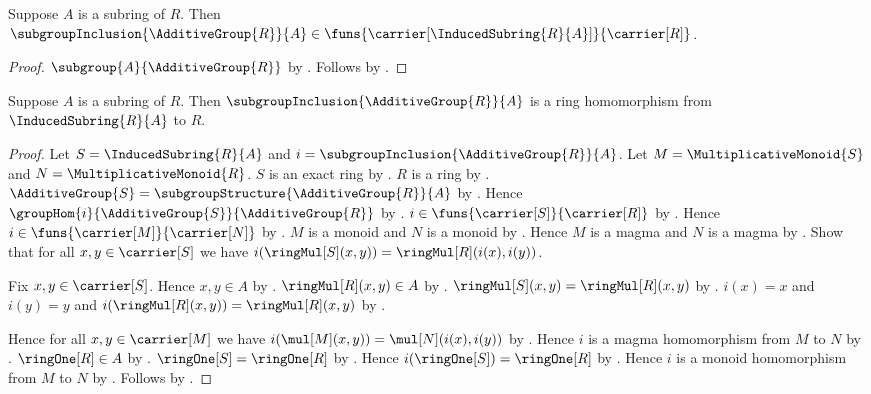 \begin{proposition}\label{induced_subring_inclusion_type}
    Suppose $A$ is a subring of $R$.
    Then $\subgroupInclusion{\AdditiveGroup{R}}{A}
        \in\funs{\carrier[\InducedSubring{R}{A}]}{\carrier[R]}$.
\end{proposition}
\begin{proof}
    $\subgroup{A}{\AdditiveGroup{R}}$ by
        .
    Follows by
        .
\end{proof}

\begin{theorem}\label{induced_subring_inclusion_hom}
    Suppose $A$ is a subring of $R$.
    Then $\subgroupInclusion{\AdditiveGroup{R}}{A}$ is a ring
        homomorphism from $\InducedSubring{R}{A}$ to $R$.
\end{theorem}
\begin{proof}
    Let $S=\InducedSubring{R}{A}$ and
        $i=\subgroupInclusion{\AdditiveGroup{R}}{A}$.
    Let $M=\MultiplicativeMonoid{S}$ and
        $N=\MultiplicativeMonoid{R}$.
    $S$ is an exact ring by .
    $R$ is a ring by .
    $\AdditiveGroup{S}=\subgroupStructure{\AdditiveGroup{R}}{A}$ by
        .
    Hence $\groupHom{i}{\AdditiveGroup{S}}{\AdditiveGroup{R}}$ by
        .
    $i\in\funs{\carrier[S]}{\carrier[R]}$ by
        .
    Hence $i\in\funs{\carrier[M]}{\carrier[N]}$ by
        .
    $M$ is a monoid and $N$ is a monoid by
        .
    Hence $M$ is a magma and $N$ is a magma by
        .
    Show that for all $x,y\in\carrier[S]$ we have
        $i(\ringMul[S](x,y))=\ringMul[R](i(x),i(y))$.
    \begin{subproof}
        Fix $x,y\in\carrier[S]$.
        Hence $x,y\in A$ by
            .
        $\ringMul[R](x,y)\in A$ by .
        $\ringMul[S](x,y)=\ringMul[R](x,y)$ by
            .
        $i(x)=x$ and $i(y)=y$ and
            $i(\ringMul[R](x,y))=\ringMul[R](x,y)$ by
            .
    \end{subproof}
    Hence for all $x,y\in\carrier[M]$ we have
        $i(\mul[M](x,y))=\mul[N](i(x),i(y))$ by
        .
    Hence $i$ is a magma homomorphism from $M$ to $N$ by
        .
    $\ringOne[R]\in A$ by .
    $\ringOne[S]=\ringOne[R]$ by .
    Hence $i(\ringOne[S])=\ringOne[R]$ by
        .
    Hence $i$ is a monoid homomorphism from $M$ to $N$ by
        .
    Follows by .
\end{proof}

